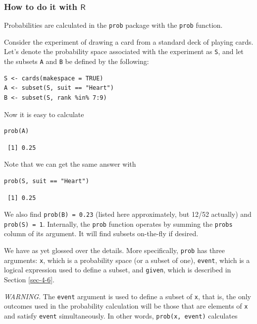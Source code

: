 \documentclass[captions=tableheading]{scrbook}
\begin{document}
\subsubsection{How to do it with \(\mathsf{R}\)}
\label{sec-4-4-3-1}


Probabilities are calculated in the \texttt{prob} package with the \texttt{prob} function.

Consider the experiment of drawing a card from a standard deck of playing cards. Let's denote the probability space associated with the experiment as \texttt{S}, and let the subsets \texttt{A} and \texttt{B} be defined by the following: 


\begin{verbatim}
S <- cards(makespace = TRUE) 
A <- subset(S, suit == "Heart") 
B <- subset(S, rank %in% 7:9)
\end{verbatim}

Now it is easy to calculate 


\begin{verbatim}
prob(A)
\end{verbatim}

\begin{verbatim}
 [1] 0.25
\end{verbatim}

Note that we can get the same answer with 


\begin{verbatim}
prob(S, suit == "Heart")
\end{verbatim}

\begin{verbatim}
 [1] 0.25
\end{verbatim}

We also find \texttt{prob(B) = 0.23} (listed here approximately, but 12/52 actually) and \texttt{prob(S) = 1}. Internally, the \texttt{prob} function operates by summing the \texttt{probs} column of its argument. It will find subsets on-the-fly if desired.

We have as yet glossed over the details. More specifically, \texttt{prob} has three arguments: \texttt{x}, which is a probability space (or a subset of one), \texttt{event}, which is a logical expression used to define a subset, and \texttt{given}, which is described in Section \ref{sec-4-6}.

\emph{WARNING}. The \texttt{event} argument is used to define a subset of \texttt{x}, that is, the only outcomes used in the probability calculation will be those that are elements of \texttt{x} and satisfy \texttt{event} simultaneously. In other words, \texttt{prob(x, event)} calculates 
\end{document}

